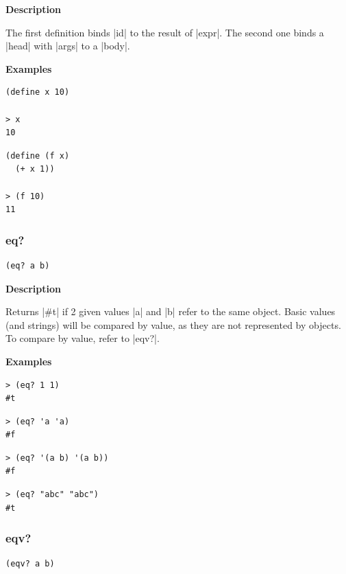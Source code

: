 \documentclass[a4paper]{article}
\begin{document}
\textbf{Description}

The first definition binds |id| to the result of |expr|. The second one binds a |head| with |args| to a |body|.

\textbf{Examples}

\begin{lstlisting}
(define x 10)

> x
10
\end{lstlisting}

\begin{lstlisting}
(define (f x)
  (+ x 1))
  
> (f 10)
11
\end{lstlisting}


\subsubsection{eq?}

\begin{lstlisting}[frame=none]
(eq? a b)
\end{lstlisting}

\textbf{Description}

Returns |#t| if 2 given values |a| and |b| refer to the same object. Basic values (and strings) will be compared by value, as they are not represented by objects. To compare by value, refer to |eqv?|.

\textbf{Examples}

\begin{lstlisting}
> (eq? 1 1)
#t
\end{lstlisting}

\begin{lstlisting}
> (eq? 'a 'a)
#f
\end{lstlisting}

\begin{lstlisting}
> (eq? '(a b) '(a b))
#f
\end{lstlisting}

\begin{lstlisting}
> (eq? "abc" "abc")
#t
\end{lstlisting}


\subsubsection{eqv?}

\begin{lstlisting}[frame=none]
(eqv? a b)
\end{lstlisting}
\end{document}
